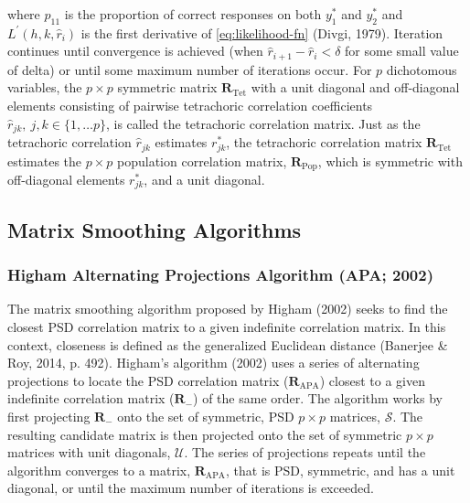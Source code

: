 \documentclass[
  english,
  man]{apa6}
\begin{document}
where \(p_{11}\) is the proportion of correct responses on both \(y_1^*\) and \(y_2^*\) and \(L^\prime(h,k,\hat{r}_i)\) is the first derivative of \eqref{eq:likelihood-fn} (Divgi, 1979). Iteration continues until convergence is achieved (when \(\hat{r}_{i+1} - \hat{r}_i < \delta\) for some small value of delta) or until some maximum number of iterations occur. For \(p\) dichotomous variables, the \(p \times p\) symmetric matrix \(\mathbf{R}_{\textrm{Tet}}\) with a unit diagonal and off-diagonal elements consisting of pairwise tetrachoric correlation coefficients \(\hat{r}_{jk}, \: j,k \in \{1, \dots p \}\), is called the tetrachoric correlation matrix. Just as the tetrachoric correlation \(\hat{r}_{jk}\) estimates \(r^*_{jk}\), the tetrachoric correlation matrix \(\mathbf{R}_{\textrm{Tet}}\) estimates the \(p \times p\) population correlation matrix, \(\mathbf{R}_{\textrm{Pop}}\), which is symmetric with off-diagonal elements \(r^*_{jk}\), and a unit diagonal.

\hypertarget{matrix-smoothing-algorithms}{%
\subsection{Matrix Smoothing Algorithms}\label{matrix-smoothing-algorithms}}

\hypertarget{higham-alternating-projections-algorithm-apa-2002}{%
\subsubsection{Higham Alternating Projections Algorithm (APA; 2002)}\label{higham-alternating-projections-algorithm-apa-2002}}

The matrix smoothing algorithm proposed by Higham (2002) seeks to find the closest PSD correlation matrix to a given indefinite correlation matrix. In this context, closeness is defined as the generalized Euclidean distance (Banerjee \& Roy, 2014, p. 492). Higham's algorithm (2002) uses a series of alternating projections to locate the PSD correlation matrix (\(\mathbf{R}_{\textrm{APA}}\)) closest to a given indefinite correlation matrix (\(\mathbf{R}_{-}\)) of the same order. The algorithm works by first projecting \(\mathbf{R}_{-}\) onto the set of symmetric, PSD \(p \times p\) matrices, \(\mathcal{S}\). The resulting candidate matrix is then projected onto the set of symmetric \(p \times p\) matrices with unit diagonals, \(\mathcal{U}\). The series of projections repeats until the algorithm converges to a matrix, \(\mathbf{R}_{\textrm{APA}}\), that is PSD, symmetric, and has a unit diagonal, or until the maximum number of iterations is exceeded.
\end{document}
